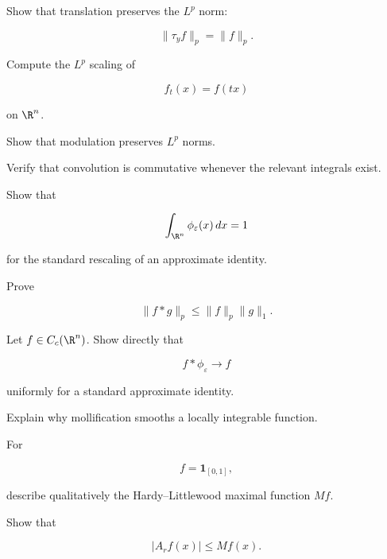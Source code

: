 \begin{exercise}[1]
Show that translation preserves the \(L^p\) norm:

\[
\|\tau_yf\|_p=\|f\|_p.
\]
\end{exercise}

\begin{exercise}[1]
Compute the \(L^p\) scaling of

\[
f_t(x)=f(tx)
\]

on \(\R^n\).
\end{exercise}

\begin{exercise}[1]
Show that modulation preserves \(L^p\) norms.
\end{exercise}

\begin{exercise}[1]
Verify that convolution is commutative whenever the relevant integrals
exist.
\end{exercise}

\begin{exercise}[1]
Show that

\[
\int_{\R^n}\phi_\varepsilon(x)\,dx=1
\]

for the standard rescaling of an approximate identity.
\end{exercise}

\begin{exercise}[2]
Prove

\[
\|f*g\|_p
\leq
\|f\|_p\|g\|_1.
\]
\end{exercise}

\begin{exercise}[2]
Let \(f\in C_c(\R^n)\). Show directly that

\[
f*\phi_\varepsilon\to f
\]

uniformly for a standard approximate identity.
\end{exercise}

\begin{exercise}[2]
Explain why mollification smooths a locally integrable function.
\end{exercise}

\begin{exercise}[2]
For

\[
f=\mathbf{1}_{[0,1]},
\]

describe qualitatively the Hardy--Littlewood maximal function \(Mf\).
\end{exercise}

\begin{exercise}[2]
Show that

\[
|A_rf(x)|
\leq
Mf(x).
\]
\end{exercise}

